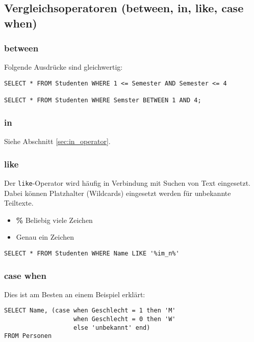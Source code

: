\subsection{Vergleichsoperatoren (between, in, like, case when)}

\subsubsection{between}
Folgende Ausdrücke sind gleichwertig:

\begin{lstlisting}[caption={Beispiel between}]
SELECT * FROM Studenten WHERE 1 <= Semester AND Semester <= 4
        
SELECT * FROM Studenten WHERE Semster BETWEEN 1 AND 4;
\end{lstlisting}

\subsubsection{in}
Siehe Abschnitt \ref{sec:in_operator}.

\subsubsection{like}
Der \texttt{like}-Operator wird häufig in Verbindung mit Suchen von Text eingesetzt. Dabei können Platzhalter (Wildcards) eingesetzt werden für unbekannte Teiltexte.

\begin{itemize}
  \item \textbf{\%} Beliebig viele Zeichen
  \item \textbf{\underline {{ }{ }}} Genau ein Zeichen
\end{itemize}

\begin{lstlisting}[caption={Beispiel für like Operator}]
SELECT * FROM Studenten WHERE Name LIKE '%im_n%'
\end{lstlisting}

\subsubsection{case when}
Dies ist am Besten an einem Beispiel erklärt:

\begin{lstlisting}[caption={Beispiel für case when}]
SELECT Name, (case when Geschlecht = 1 then 'M'
                   when Geschlecht = 0 then 'W'
                   else 'unbekannt' end)
FROM Personen
\end{lstlisting}

